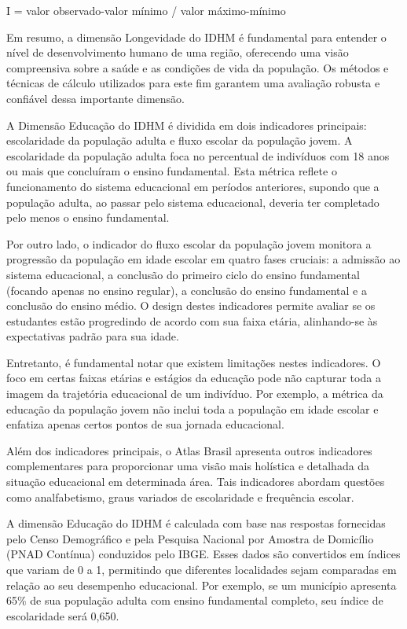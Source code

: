 \documentclass[
]{article}
\begin{document}
I = valor observado-valor mínimo / valor máximo-mínimo

Em resumo, a dimensão Longevidade do IDHM é fundamental para entender o
nível de desenvolvimento humano de uma região, oferecendo uma visão
compreensiva sobre a saúde e as condições de vida da população. Os
métodos e técnicas de cálculo utilizados para este fim garantem uma
avaliação robusta e confiável dessa importante dimensão.

A Dimensão Educação do IDHM é dividida em dois indicadores principais:
escolaridade da população adulta e fluxo escolar da população jovem. A
escolaridade da população adulta foca no percentual de indivíduos com 18
anos ou mais que concluíram o ensino fundamental. Esta métrica reflete o
funcionamento do sistema educacional em períodos anteriores, supondo que
a população adulta, ao passar pelo sistema educacional, deveria ter
completado pelo menos o ensino fundamental.

Por outro lado, o indicador do fluxo escolar da população jovem monitora
a progressão da população em idade escolar em quatro fases cruciais: a
admissão ao sistema educacional, a conclusão do primeiro ciclo do ensino
fundamental (focando apenas no ensino regular), a conclusão do ensino
fundamental e a conclusão do ensino médio. O design destes indicadores
permite avaliar se os estudantes estão progredindo de acordo com sua
faixa etária, alinhando-se às expectativas padrão para sua idade.

Entretanto, é fundamental notar que existem limitações nestes
indicadores. O foco em certas faixas etárias e estágios da educação pode
não capturar toda a imagem da trajetória educacional de um indivíduo.
Por exemplo, a métrica da educação da população jovem não inclui toda a
população em idade escolar e enfatiza apenas certos pontos de sua
jornada educacional.

Além dos indicadores principais, o Atlas Brasil apresenta outros
indicadores complementares para proporcionar uma visão mais holística e
detalhada da situação educacional em determinada área. Tais indicadores
abordam questões como analfabetismo, graus variados de escolaridade e
frequência escolar.

A dimensão Educação do IDHM é calculada com base nas respostas
fornecidas pelo Censo Demográfico e pela Pesquisa Nacional por Amostra
de Domicílio (PNAD Contínua) conduzidos pelo IBGE. Esses dados são
convertidos em índices que variam de 0 a 1, permitindo que diferentes
localidades sejam comparadas em relação ao seu desempenho educacional.
Por exemplo, se um município apresenta 65\% de sua população adulta com
ensino fundamental completo, seu índice de escolaridade será 0,650.
\end{document}
